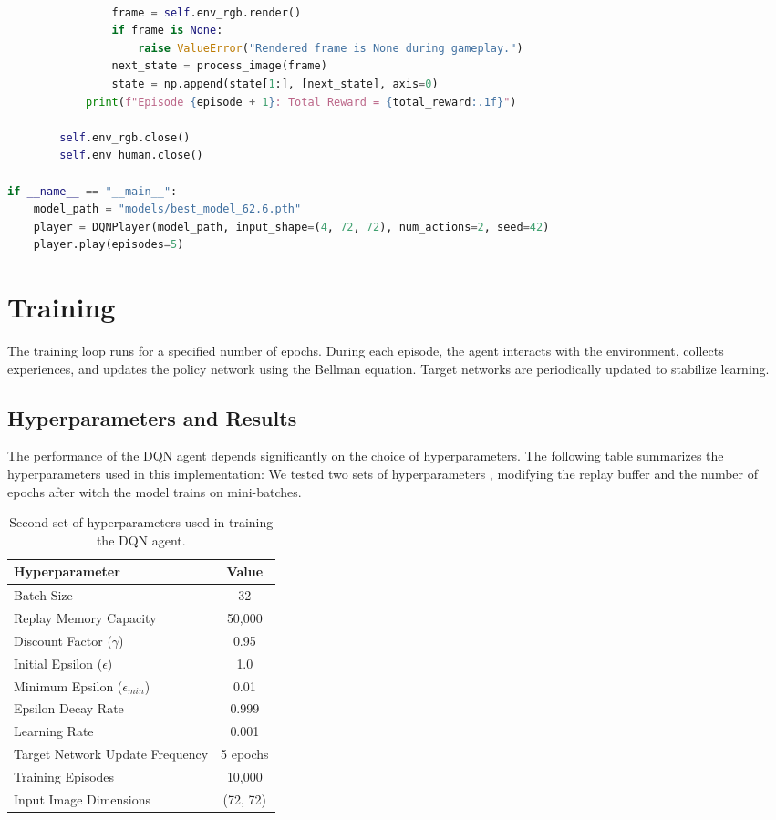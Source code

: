 \documentclass[a4paper,12pt]{article}
\begin{document}
\begin{lstlisting}[language=Python, caption=Testing player]
                    
                frame = self.env_rgb.render()
                if frame is None:
                    raise ValueError("Rendered frame is None during gameplay.")
                next_state = process_image(frame)
                state = np.append(state[1:], [next_state], axis=0)  
            print(f"Episode {episode + 1}: Total Reward = {total_reward:.1f}")

        self.env_rgb.close()
        self.env_human.close()

if __name__ == "__main__":
    model_path = "models/best_model_62.6.pth" 
    player = DQNPlayer(model_path, input_shape=(4, 72, 72), num_actions=2, seed=42)
    player.play(episodes=5)
\end{lstlisting}


\section{Training}
The training loop runs for a specified number of epochs. During each episode, the agent interacts with the environment, collects experiences, and updates the policy network using the Bellman equation. Target networks are periodically updated to stabilize learning.

\subsection{Hyperparameters and Results}
The performance of the DQN agent depends significantly on the choice of hyperparameters. The following table summarizes the hyperparameters used in this implementation:
We tested two sets of hyperparameters , modifying the replay buffer and the number of epochs after witch the model trains on mini-batches.
\begin{table}[ht!]
    \centering
    \begin{tabular}{|l|c|}
        \hline
        \textbf{Hyperparameter} & \textbf{Value} \\
        \hline
        Batch Size & 32 \\
        \rowcolor{lime}
        Replay Memory Capacity & 50,000 \\
        Discount Factor ($\gamma$) & 0.95 \\
        Initial Epsilon ($\epsilon$) & 1.0 \\
        Minimum Epsilon ($\epsilon_{min}$) & 0.01 \\
        Epsilon Decay Rate & 0.999 \\
        Learning Rate & 0.001 \\
        \rowcolor{lime}
        Target Network Update Frequency & 5 epochs \\
        Training Episodes & 10,000 \\
        Input Image Dimensions & (72, 72) \\
        \hline
    \end{tabular}
    \caption{Second set of hyperparameters used in training the DQN agent.}
    \label{tab:hyperparameters}
\end{table}
\end{document}
